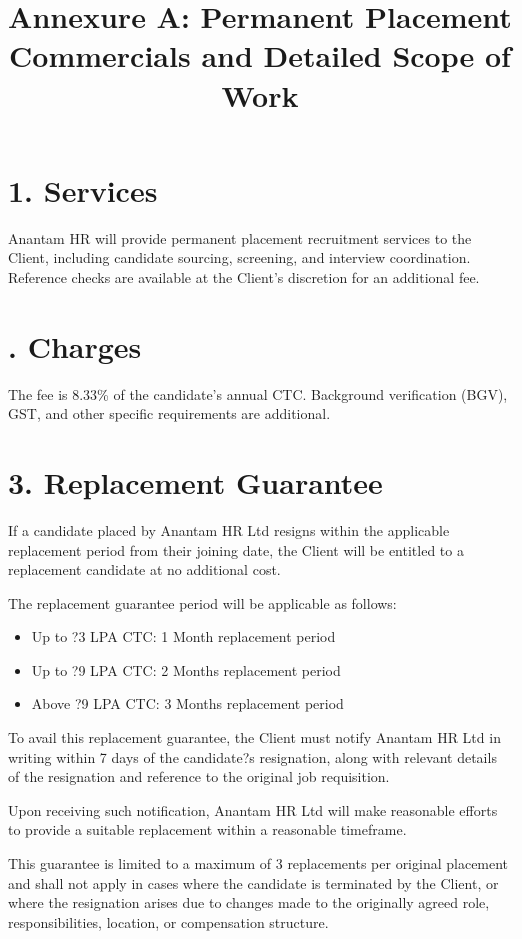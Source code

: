 \documentclass{article}
\title{Annexure A: Permanent Placement Commercials and Detailed Scope of Work}
\date{}
\begin{document}
\maketitle

\section*{1. Services}
Anantam HR will provide permanent placement recruitment services to the Client, including candidate sourcing, screening, and interview coordination. Reference checks are available at the Client's discretion for an additional fee.

\section*{. Charges}
The fee is 8.33\% of the candidate's annual CTC. Background verification (BGV), GST, and other specific requirements are additional.

\section*{3. Replacement Guarantee}

If a candidate placed by Anantam HR Ltd resigns within the applicable replacement period from their joining date, the Client will be entitled to a replacement candidate at no additional cost.

The replacement guarantee period will be applicable as follows:

\begin{itemize}
\item Up to ?3 LPA CTC: 1 Month replacement period
\item Up to ?9 LPA CTC: 2 Months replacement period
\item Above ?9 LPA CTC: 3 Months replacement period
\end{itemize}

To avail this replacement guarantee, the Client must notify Anantam HR Ltd in writing within 7 days of the candidate?s resignation, along with relevant details of the resignation and reference to the original job requisition.

Upon receiving such notification, Anantam HR Ltd will make reasonable efforts to provide a suitable replacement within a reasonable timeframe.

This guarantee is limited to a maximum of 3 replacements per original placement and shall not apply in cases where the candidate is terminated by the Client, or where the resignation arises due to changes made to the originally agreed role, responsibilities, location, or compensation structure.
\end{document}
